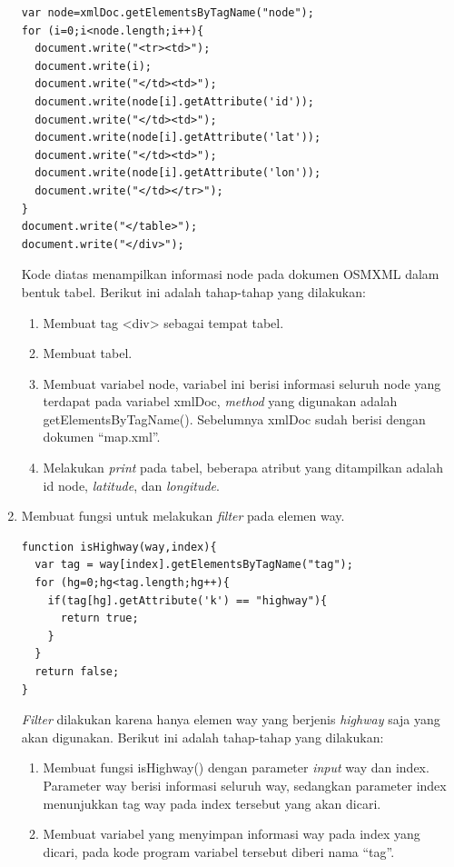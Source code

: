 \begin{enumerate}
\begin{verbatim}
var node=xmlDoc.getElementsByTagName("node");
for (i=0;i<node.length;i++){
  document.write("<tr><td>");
  document.write(i);
  document.write("</td><td>");
  document.write(node[i].getAttribute('id'));
  document.write("</td><td>");
  document.write(node[i].getAttribute('lat'));
  document.write("</td><td>");
  document.write(node[i].getAttribute('lon'));
  document.write("</td></tr>");
}
document.write("</table>");
document.write("</div>");
\end{verbatim}
Kode diatas menampilkan informasi node pada dokumen OSMXML dalam bentuk tabel.
Berikut ini adalah tahap-tahap yang dilakukan:
\begin{enumerate}
  \item Membuat tag <div> sebagai tempat tabel.
  
  \item Membuat tabel.
  
  \item Membuat variabel node, variabel ini berisi informasi seluruh node yang
  terdapat pada variabel xmlDoc, \textit{method} yang digunakan adalah
  getElementsByTagName(). Sebelumnya xmlDoc sudah berisi dengan dokumen ``map.xml''.
  
  \item Melakukan \textit{print} pada tabel, beberapa atribut yang ditampilkan
  adalah id node, \textit{latitude}, dan \textit{longitude}.
\end{enumerate}

  \item Membuat fungsi untuk melakukan \textit{filter} pada elemen way.
\begin{verbatim}
function isHighway(way,index){
  var tag = way[index].getElementsByTagName("tag");
  for (hg=0;hg<tag.length;hg++){
    if(tag[hg].getAttribute('k') == "highway"){
      return true;
    }
  }
  return false;
}
\end{verbatim}
\textit{Filter} dilakukan karena hanya elemen way yang berjenis \textit{highway}
saja yang akan digunakan. Berikut ini adalah tahap-tahap yang dilakukan:
\begin{enumerate}
  \item Membuat fungsi isHighway() dengan parameter \textit{input} way dan
  index. Parameter way berisi informasi seluruh way, sedangkan parameter index
  menunjukkan tag way pada index tersebut yang akan dicari.
  
  \item Membuat variabel yang menyimpan informasi way pada index yang dicari,
  pada kode program variabel tersebut diberi nama ``tag''.
  

\end{enumerate}
\end{enumerate}
